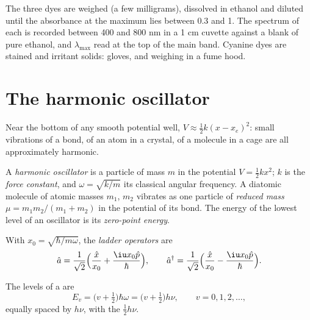 \begin{inthelab}
The three dyes are weighed (a few milligrams), dissolved in ethanol and
diluted until the absorbance at the maximum lies between 0.3 and 1. The
spectrum of each is recorded between 400 and 800 nm in a 1 cm cuvette
against a blank of pure ethanol, and $\lambda_{\max}$ read at the top of the
main band. Cyanine dyes are stained and irritant solids: gloves, and
weighing in a fume hood.
\end{inthelab}

\section{The harmonic oscillator}

Near the bottom of any smooth potential well, $V \approx \frac12 k(x - x_e)^2$:
small vibrations of a bond, of an atom in a crystal, of a molecule in a
cage are all approximately harmonic.

\begin{definition}\label{def:b3:quantum-model-systems:oscillator}
A \emph{harmonic oscillator} is a particle of
mass $m$ in the potential $V = \frac12 kx^2$; $k$ is the \emph{force
constant}, and $\omega = \sqrt{k/m}$ its classical
angular frequency. A diatomic molecule of atomic masses $m_1$, $m_2$
vibrates as one particle of \emph{reduced mass}
$\mu = m_1m_2/(m_1 + m_2)$ in the potential of its bond. The energy of the
lowest level of an oscillator is its \emph{zero-point energy}.
\end{definition}

\begin{definition}\label{def:b3:quantum-model-systems:ladder}
With $x_0 = \sqrt{\hbar/m\omega}$, the \emph{ladder operators}
are
\[
\hat a = \frac{1}{\sqrt2}\Big(\frac{\hat x}{x_0} + \frac{\iu x_0\hat p}{\hbar}\Big),
\qquad \hat a^\dagger = \frac{1}{\sqrt2}\Big(\frac{\hat x}{x_0} -
\frac{\iu x_0\hat p}{\hbar}\Big).
\]
\end{definition}

\begin{theorem}\label{thm:b3:quantum-model-systems:oscillator}
The levels of a  are
\[
E_v = \big(v + \tfrac12\big)\hbar\omega = \big(v + \tfrac12\big)h\nu, \qquad v =
0, 1, 2, \dots,
\]
equally spaced by $h\nu$, with the  $\frac12h\nu$.
\end{theorem}

